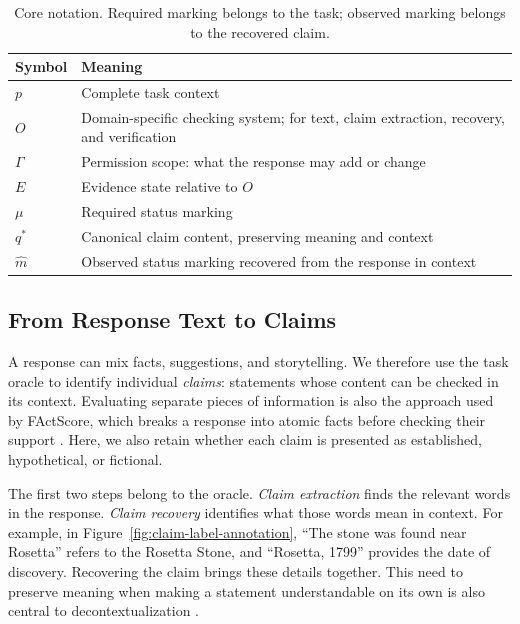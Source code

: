 \documentclass{clv2025}
\begin{document}
\begin{table}[!ht]
\centering\small
\caption{Core notation. Required marking belongs to the task; observed marking belongs to the recovered claim.}
\label{tab:notation}
\begin{tabularx}{\linewidth}{@{}lY@{}}
\toprule
Symbol & Meaning\\\midrule
$p$ & Complete task context\\
$O$ & Domain-specific checking system; for text, claim extraction, recovery, and verification\\
$\Gamma$ & Permission scope: what the response may add or change\\
$E$ & Evidence state relative to $O$\\
$\mu$ & Required status marking\\
$q^*$ & Canonical claim content, preserving meaning and context\\
$\widehat{m}$ & Observed status marking recovered from the response in context\\
\bottomrule
\end{tabularx}
\end{table}
\FloatBarrier

\subsection{From Response Text to Claims}\label{subsec:unit}

A response can mix facts, suggestions, and storytelling. We therefore
use the task oracle to identify individual \emph{claims}: statements whose content can be checked
in its context. Evaluating separate pieces of information is also the
approach used by FActScore, which breaks a response into atomic facts before
checking their support \citep{min_factscore_2023}. Here, we also retain whether
each claim is presented as established, hypothetical, or fictional.

The first two steps belong to the oracle. \emph{Claim extraction} finds the relevant words
in the response. \emph{Claim recovery} identifies what those words mean in
context. For example, in Figure~\ref{fig:claim-label-annotation}, ``The stone
was found near Rosetta'' refers to the Rosetta Stone, and ``Rosetta, 1799''
provides the date of discovery. Recovering the claim brings these details
together. This need to preserve meaning when making a statement understandable
on its own is also central to decontextualization
\citep{choi_decontextualization_2021}.
\end{document}
